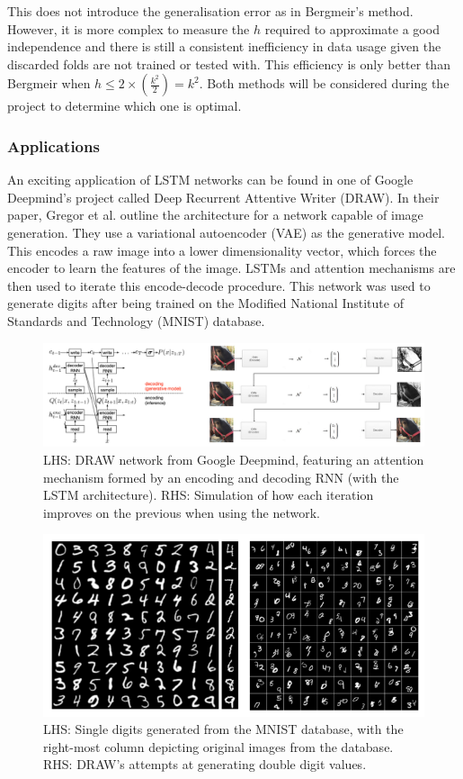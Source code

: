 \documentclass[10pt,onecolumn,letterpaper]{article}
\begin{document}
This does not introduce the generalisation error as in Bergmeir's method. However, it is more complex to measure the $h$ required to approximate a good independence and there is still a consistent inefficiency in data usage given the discarded folds are not trained or tested with. This efficiency is only better than Bergmeir when $h \leq 2\times(\frac{k^{2}}{2}) = k^{2}$. Both methods will be considered during the project to determine which one is optimal.

\subsubsection{Applications} 

An exciting application of LSTM networks can be found in one of Google Deepmind's project called Deep Recurrent Attentive Writer (DRAW). In their paper\cite{Gregor}, Gregor et al. outline the architecture for a network capable of image generation. They use a variational autoencoder (VAE) as the generative model. This encodes a raw image into a lower dimensionality vector, which forces the encoder to learn the features of the image. LSTMs and attention mechanisms are then used to iterate this encode-decode procedure. This network was used to generate digits after being trained on the Modified National Institute of Standards and Technology (MNIST) database. 

\begin{figure}[!hbt!]
\centering
\includegraphics[width=14.5cm]{draw_network.png}
\caption{LHS: DRAW network from Google Deepmind, featuring an attention mechanism formed by an encoding and decoding RNN (with the LSTM architecture). RHS: Simulation of how each iteration improves on the previous when using the network.}
\end{figure}

\begin{figure}[!hbt!]
\centering
\includegraphics[width=12.5cm]{draw_results.png}
\caption{LHS: Single digits generated from the MNIST database, with the right-most column depicting original images from the database. RHS: DRAW's attempts at generating double digit values.}
\end{figure}
\end{document}
